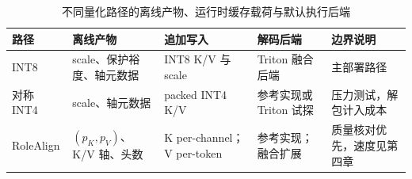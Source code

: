 \begin{table}[!htbp]
  \centering
  \caption{不同量化路径的离线产物、运行时缓存载荷与默认执行后端}
  \label{tab:ch3-runtime-paths}
  \scriptsize
  \setlength{\tabcolsep}{2.0pt}
  \renewcommand{\arraystretch}{1.14}
  \begin{tabularx}{\linewidth}{>{\raggedright\arraybackslash}p{1.35cm}>{\raggedright\arraybackslash}p{2.35cm}>{\raggedright\arraybackslash}p{2.95cm}>{\raggedright\arraybackslash}p{2.25cm}X}
    \toprule
    路径 & 离线产物 & 追加写入 & 解码后端 & 边界说明 \\
    \midrule
    INT8 & scale、保护裕度、轴元数据 & INT8 K/V 与 scale & Triton 融合后端 & 主部署路径 \\
    对称 INT4 & scale、轴元数据 & packed INT4 K/V & 参考实现或 Triton 试探 & 压力测试，解包计入成本 \\
    RoleAlign & $(p_K,p_V)$、K/V 轴、头数 & K per-channel；V per-token & 参考实现；融合扩展 & 质量核对优先，速度见第四章 \\
    \bottomrule
  \end{tabularx}
\end{table}
